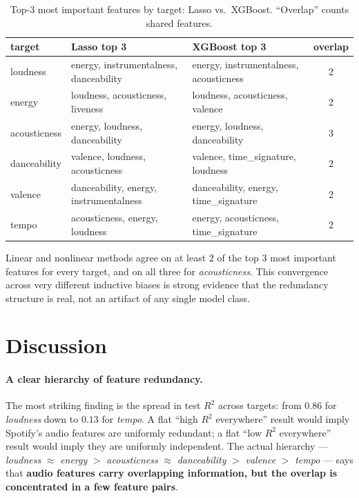 \documentclass[11pt]{article}
\begin{document}
\begin{table}[H]
\centering
\caption{Top-3 most important features by target: Lasso vs.\ XGBoost. ``Overlap'' counts shared features.}
\label{tab:agreement}
\small
\begin{tabular}{l p{4.4cm} p{4.4cm} c}
\toprule
\textbf{target} & \textbf{Lasso top 3} & \textbf{XGBoost top 3} & \textbf{overlap} \\
\midrule
loudness     & energy, instrumentalness, danceability & energy, instrumentalness, acousticness & 2 \\
energy       & loudness, acousticness, liveness       & loudness, acousticness, valence        & 2 \\
acousticness & energy, loudness, danceability         & energy, loudness, danceability         & 3 \\
danceability & valence, loudness, acousticness        & valence, time\_signature, loudness     & 2 \\
valence      & danceability, energy, instrumentalness & danceability, energy, time\_signature  & 2 \\
tempo        & acousticness, energy, loudness         & energy, acousticness, time\_signature  & 2 \\
\bottomrule
\end{tabular}
\end{table}

Linear and nonlinear methods agree on at least $2$ of the top $3$ most important features for every target, and on all three for \emph{acousticness}. This convergence across very different inductive biases is strong evidence that the redundancy structure is real, not an artifact of any single model class.

\section{Discussion}

\paragraph{A clear hierarchy of feature redundancy.} The most striking finding is the spread in test $R^2$ across targets: from $0.86$ for \emph{loudness} down to $0.13$ for \emph{tempo}. A flat ``high $R^2$ everywhere'' result would imply Spotify's audio features are uniformly redundant; a flat ``low $R^2$ everywhere'' result would imply they are uniformly independent. The actual hierarchy --- \emph{loudness} $\approx$ \emph{energy} $>$ \emph{acousticness} $\approx$ \emph{danceability} $>$ \emph{valence} $>$ \emph{tempo} --- says that \textbf{audio features carry overlapping information, but the overlap is concentrated in a few feature pairs}.
\end{document}
